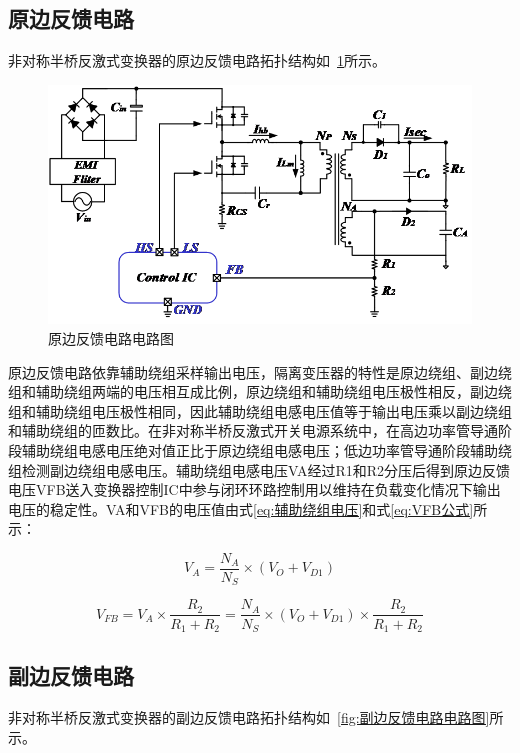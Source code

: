 \subsection{原边反馈电路}
非对称半桥反激式变换器的原边反馈电路拓扑结构如~\ref{fig:原边反馈电路电路图}所示。

\begin{figure}[htbp] 
    \centering
    \includegraphics[width=0.8\linewidth]{figures/原边反馈电路图.png}
    \caption{原边反馈电路电路图}
    \label{fig:原边反馈电路电路图}
\end{figure}

原边反馈电路依靠辅助绕组采样输出电压，隔离变压器的特性是原边绕组、副边绕组和辅助绕组两端的电压相互成比例，原边绕组和辅助绕组电压极性相反，副边绕组和辅助绕组电压极性相同，因此辅助绕组电感电压值等于输出电压乘以副边绕组和辅助绕组的匝数比。在非对称半桥反激式开关电源系统中，在高边功率管导通阶段辅助绕组电感电压绝对值正比于原边绕组电感电压；低边功率管导通阶段辅助绕组检测副边绕组电感电压。辅助绕组电感电压VA经过R1和R2分压后得到原边反馈电压VFB送入变换器控制IC中参与闭环环路控制用以维持在负载变化情况下输出电压的稳定性。VA和VFB的电压值由式\eqref{eq:辅助绕组电压}和式\eqref{eq:VFB公式}所示：

\begin{equation}
    \label{eq:辅助绕组电压}
    V_A = \frac{N_A}{N_S}\times(V_O + V_{D1})
\end{equation}

\begin{equation}
    \label{eq:VFB公式}
    V_{FB} = V_A\times\frac{R_2}{R_1+R_2}=\frac{N_A}{N_S}\times(V_O + V_{D1})\times\frac{R_2}{R_1+R_2}
\end{equation}

\subsection{副边反馈电路}
非对称半桥反激式变换器的副边反馈电路拓扑结构如~\ref{fig:副边反馈电路电路图}所示。

